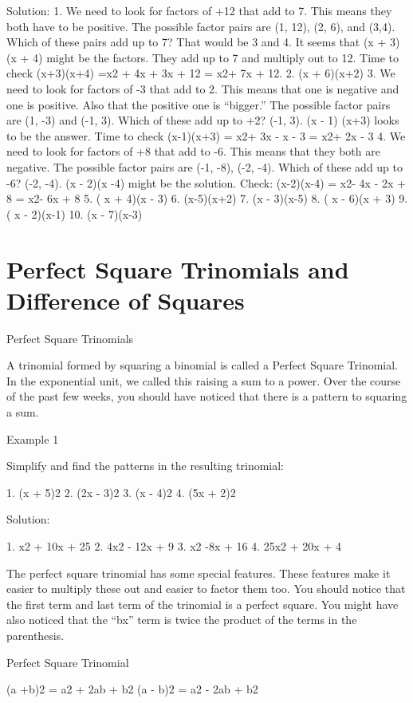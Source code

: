 Solution:
1. We need to look for factors of +12 that add to 7. This means they both have to be positive. The possible factor pairs are (1, 12), (2, 6), and (3,4). Which of these pairs add up to 7? That would be 3 and 4. It seems that (x + 3)(x + 4) might be the factors. They add up to 7 and multiply out to 12. Time to check (x+3)(x+4) =x2 + 4x + 3x + 12 = x2+ 7x + 12.
2. (x + 6)(x+2)
3. We need to look for factors of -3 that add to 2. This means that one is negative and one is positive. Also that the positive one is ``bigger.'' The possible factor pairs are (1, -3) and (-1, 3). Which of these add up to +2? (-1, 3). (x - 1) (x+3) looks to be the answer. Time to check (x-1)(x+3) = x2+ 3x - x - 3 = x2+ 2x - 3
4. We need to look for factors of +8 that add to -6. This means that they both are negative. The possible factor pairs are (-1, -8), (-2, -4). Which of these add up to -6? (-2, -4). (x - 2)(x -4) might be the solution. Check: (x-2)(x-4) = x2- 4x - 2x + 8 = x2- 6x + 8
5. ( x + 4)(x - 3)
6. (x-5)(x+2)
7. (x - 3)(x-5)
8. ( x - 6)(x + 3)
9. ( x - 2)(x-1)
10. (x - 7)(x-3)


\section{Perfect Square Trinomials and Difference of Squares}

Perfect Square Trinomials

A trinomial formed by squaring a binomial is called a Perfect Square Trinomial. In the exponential unit, we called this raising a sum to a power. Over the course of the past few weeks, you should have noticed that there is a pattern to squaring a sum. 

Example 1

Simplify and find the patterns in the resulting trinomial: 

1. (x + 5)2
2. (2x - 3)2
3. (x - 4)2
4. (5x + 2)2


Solution:

1. x2 + 10x + 25
2. 4x2 - 12x + 9
3. x2 -8x + 16
4. 25x2 + 20x + 4

The perfect square trinomial has some special features. These features make it easier to multiply these out and easier to factor them too. You should notice that the first term and last term of the trinomial is a perfect square. You might have also noticed that the ``bx'' term is twice the product of the terms in the parenthesis.

Perfect Square Trinomial 

(a +b)2 = a2 + 2ab + b2
(a - b)2 = a2 - 2ab + b2

